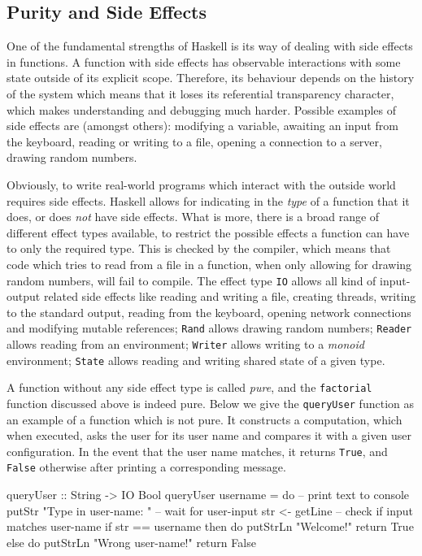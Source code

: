 \subsection{Purity and Side Effects}
\label{sec:purity_sideeffects}
One of the fundamental strengths of Haskell is its way of dealing with side effects in functions. A function with side effects has observable interactions with some state outside of its explicit scope. Therefore, its behaviour depends on the history of the system which means that it loses its referential transparency character, which makes understanding and debugging much harder. Possible examples of side effects are (amongst others): modifying a variable, awaiting an input from the keyboard, reading or writing to a file, opening a connection to a server, drawing random numbers.

Obviously, to write real-world programs which interact with the outside world requires side effects. Haskell allows for indicating in the \textit{type} of a function that it does, or does \textit{not} have side effects. What is more, there is a broad range of different effect types available, to restrict the possible effects a function can have to only the required type. This is checked by the compiler, which means that code which tries to read from a file in a function, when only allowing for drawing random numbers, will fail to compile. The effect type \texttt{IO} allows all kind of input-output related side effects like reading and writing a file, creating threads, writing to the standard output, reading from the keyboard, opening network connections and modifying mutable references; \texttt{Rand} allows drawing random numbers; \texttt{Reader} allows reading from an environment; \texttt{Writer} allows writing to a \textit{monoid} environment; \texttt{State} allows reading and writing shared state of a given type.

A function without any side effect type is called \textit{pure}, and the \texttt{factorial} function discussed above is indeed pure. Below we give the \texttt{queryUser} function as an example of a function which is not pure. It constructs a computation, which when executed, asks the user for its user name and compares it with a given user configuration. In the event that the user name matches, it returns \texttt{True}, and \texttt{False} otherwise after printing a corresponding message. 

\begin{HaskellCode}
queryUser :: String -> IO Bool
queryUser username = do
  -- print text to console
  putStr "Type in user-name: "
  -- wait for user-input
  str <- getLine
  -- check if input matches user-name
  if str == username
    then do
      putStrLn "Welcome!"			
      return True
    else do
      putStrLn "Wrong user-name!"
      return False
\end{HaskellCode}

